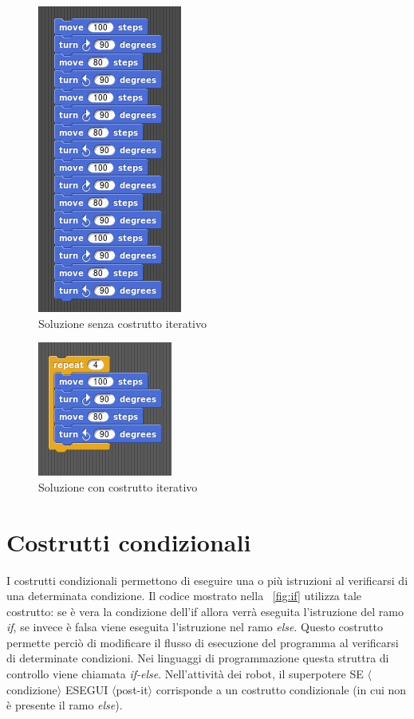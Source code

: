 \documentclass[12pt]{article}
\begin{document}
\begin{figure}
\centering
\includegraphics[scale=0.7]{img/non_iter.jpg}
\caption{Soluzione senza costrutto iterativo}
\label{fig:sol_non_iter}
\end{figure}

\begin{figure}
\centering
\includegraphics[scale=0.7]{img/loop.jpg}
\caption{Soluzione con costrutto iterativo}
\label{fig:sol_iter}
\end{figure}
%
%
\section{Costrutti condizionali}
I costrutti condizionali permettono di eseguire una o più istruzioni al verificarsi di una determinata condizione. Il codice mostrato nella \figurename~\ref{fig:if} utilizza tale costrutto: se è vera la condizione dell'if allora verrà eseguita l'istruzione del ramo \textit{if}, se invece è falsa viene eseguita l'istruzione nel ramo \textit{else}. Questo costrutto permette perciò di modificare il flusso di esecuzione del programma al verificarsi di determinate condizioni. Nei linguaggi di programmazione questa struttra di controllo viene chiamata \textit{if-else}. Nell'attività dei robot, il superpotere SE $\langle$condizione$\rangle$ ESEGUI $\langle$post-it$\rangle$ corrisponde a un costrutto condizionale (in cui non è presente il ramo \textit{else}).
\end{document}
